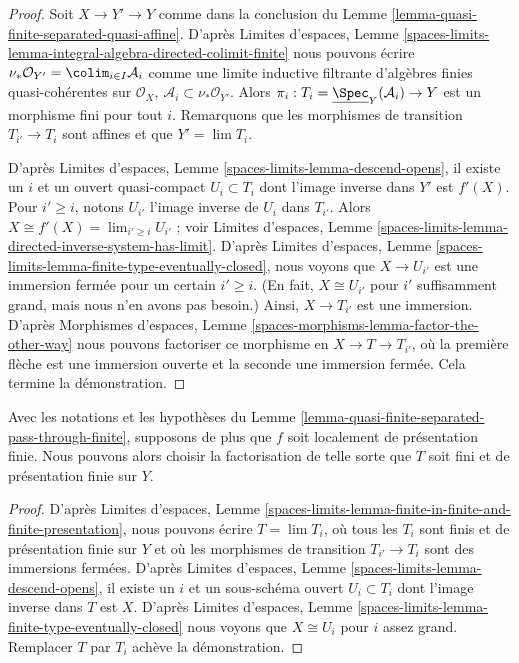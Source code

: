 \begin{proof}
Soit $X \to Y' \to Y$ comme dans la conclusion du
Lemme \ref{lemma-quasi-finite-separated-quasi-affine}.
D'après
Limites d'espaces, Lemme
\ref{spaces-limits-lemma-integral-algebra-directed-colimit-finite}
nous pouvons écrire
$\nu_*\mathcal{O}_{Y'} = \colim_{i \in I} \mathcal{A}_i$ comme une
limite inductive filtrante d'algèbres finies quasi-cohérentes sur $\mathcal{O}_X$,
$\mathcal{A}_i \subset \nu_*\mathcal{O}_{Y'}$. Alors
$\pi_i : T_i = \underline{\Spec}_Y(\mathcal{A}_i) \to Y$
est un morphisme fini pour tout $i$.
Remarquons que les morphismes de transition $T_{i'} \to T_i$ sont affines
et que $Y' = \lim T_i$.

\medskip\noindent
D'après Limites d'espaces, Lemme \ref{spaces-limits-lemma-descend-opens},
il existe un $i$ et un ouvert quasi-compact
$U_i \subset T_i$ dont l'image inverse dans $Y'$ est
$f'(X)$. Pour $i' \geq i$, notons $U_{i'}$ l'image inverse
de $U_i$ dans $T_{i'}$. Alors $X \cong f'(X) = \lim_{i' \geq i} U_{i'}$ ; voir
Limites d'espaces, Lemme
\ref{spaces-limits-lemma-directed-inverse-system-has-limit}.
D'après
Limites d'espaces, Lemme
\ref{spaces-limits-lemma-finite-type-eventually-closed}, nous voyons que
$X \to U_{i'}$ est une immersion fermée pour un certain $i' \geq i$.
(En fait, $X \cong U_{i'}$ pour $i'$ suffisamment
grand, mais nous n'en avons pas besoin.) Ainsi, $X \to T_{i'}$ est une immersion. D'après
Morphismes d'espaces, Lemme
\ref{spaces-morphisms-lemma-factor-the-other-way}
nous pouvons factoriser ce morphisme en $X \to T \to T_{i'}$, où la première flèche
est une immersion ouverte et la seconde une immersion fermée. Cela termine la démonstration.
\end{proof}

\begin{lemma}
\label{lemma-quasi-finite-separated-pass-through-finite-addendum}
Avec les notations et les hypothèses du
Lemme \ref{lemma-quasi-finite-separated-pass-through-finite},
supposons de plus que $f$ soit localement de présentation finie. Nous pouvons alors
choisir la factorisation de telle sorte que $T$ soit fini et de
présentation finie sur $Y$.
\end{lemma}

\begin{proof}
D'après Limites d'espaces, Lemme
\ref{spaces-limits-lemma-finite-in-finite-and-finite-presentation}, nous pouvons écrire
$T = \lim T_i$, où tous les $T_i$ sont finis et de présentation finie
sur $Y$ et où les morphismes de transition $T_{i'} \to T_i$ sont des
immersions fermées. D'après
Limites d'espaces, Lemme \ref{spaces-limits-lemma-descend-opens},
il existe un $i$ et un sous-schéma ouvert $U_i \subset T_i$ dont l'image
inverse dans $T$ est $X$. D'après
Limites d'espaces, Lemme
\ref{spaces-limits-lemma-finite-type-eventually-closed}
nous voyons que $X \cong U_i$ pour $i$ assez grand.
Remplacer $T$ par $T_i$ achève la démonstration.
\end{proof}












